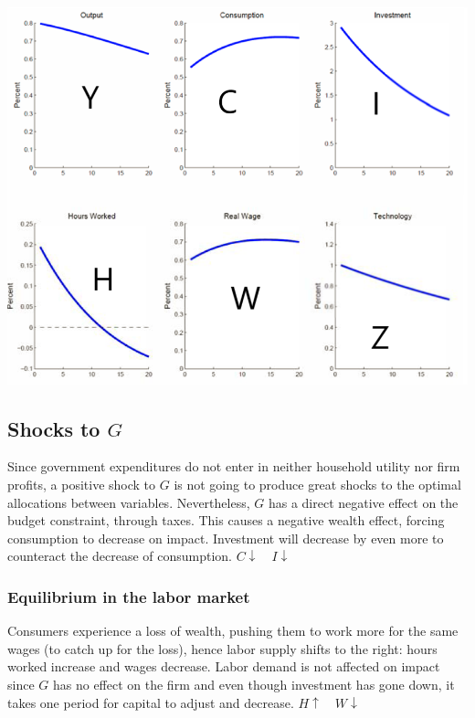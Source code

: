 \documentclass[12pt]{report}
\begin{document}
\begin{center}
\includegraphics[scale=0.55]{images/RBC2-zshock.png} 
\end{center}

\subsection{Shocks to $G$}

Since government expenditures do not enter in neither household utility nor firm profits, a positive shock to $G$ is not going to produce great shocks to the optimal allocations between variables. Nevertheless, $G$ has a direct negative effect on the budget constraint, through taxes. This causes a negative wealth effect, forcing consumption to decrease on impact. Investment will decrease by even more to counteract the decrease of consumption. $C\downarrow \quad I\downarrow $

\subsubsection{Equilibrium in the labor market}

Consumers experience a loss of wealth, pushing them to work more for the same wages (to catch up for the loss), hence labor supply shifts to the right: hours worked increase and wages decrease. Labor demand is not affected on impact since $G$ has no effect on the firm and even though investment has gone down, it takes one period for capital to adjust and decrease. $H\uparrow\quad W\downarrow$
\end{document}
